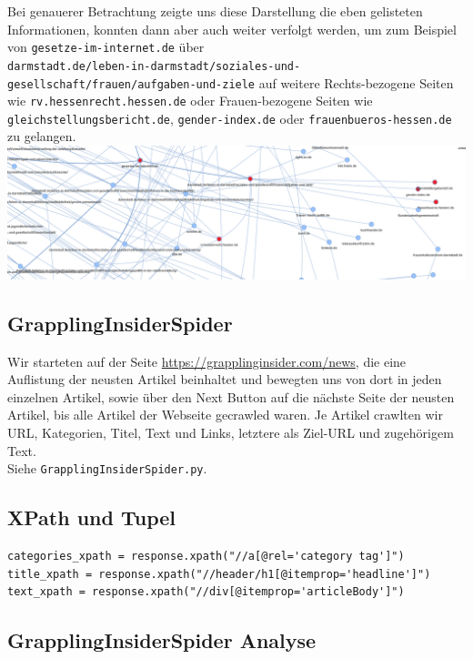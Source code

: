 \noindent Bei genauerer Betrachtung zeigte uns diese Darstellung die eben gelisteten Informationen, konnten dann aber auch weiter verfolgt werden, um zum Beispiel von \texttt{gesetze-im-internet.de} über \\\texttt{darmstadt.de/leben-in-darmstadt/soziales-und-gesellschaft/frauen/aufgaben-und-ziele} auf weitere Rechts-bezogene Seiten wie \texttt{rv.hessenrecht.hessen.de} oder Frauen-bezogene Seiten wie \texttt{gleichstellungsbericht.de}, \texttt{gender-index.de} oder \texttt{frauenbueros-hessen.de} zu gelangen. \\

\includegraphics[width=\textwidth]{images/DarmstadtSpiderGraph2.png}

\subsection{GrapplingInsiderSpider}

Wir starteten auf der Seite \url{https://grapplinginsider.com/news}, die eine Auflistung der neusten Artikel beinhaltet und bewegten uns von dort in jeden einzelnen Artikel, sowie über den Next Button auf die nächste Seite der neusten Artikel, bis alle Artikel der Webseite gecrawled waren. Je Artikel crawlten wir URL, Kategorien, Titel, Text und Links, letztere als Ziel-URL und zugehörigem Text. \\

\noindent Siehe \texttt{GrapplingInsiderSpider.py}.

\subsection{XPath und Tupel}

{\color{MidnightBlue}
\begin{lstlisting}
categories_xpath = response.xpath("//a[@rel='category tag']")
title_xpath = response.xpath("//header/h1[@itemprop='headline']")
text_xpath = response.xpath("//div[@itemprop='articleBody']")
\end{lstlisting}}

\subsection{GrapplingInsiderSpider Analyse}

